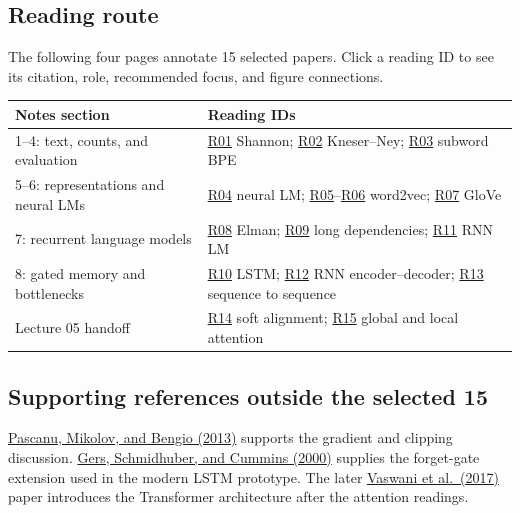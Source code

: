 \documentclass[11pt,a4paper]{article}
\newcommand{\readingref}[1]{\hyperlink{reading:#1}{#1}}
\begin{document}
\subsection{Reading route}
The following four pages annotate 15 selected papers. Click a reading ID
to see its citation, role, recommended focus, and figure connections.

\begin{tabularx}{\textwidth}{@{}l Y@{}}
\toprule
Notes section & Reading IDs\\
--4: text, counts, and evaluation & \readingref{R01} Shannon;
\readingref{R02} Kneser--Ney; \readingref{R03} subword BPE\\
5--6: representations and neural LMs & \readingref{R04} neural LM;
\readingref{R05}--\readingref{R06} word2vec; \readingref{R07} GloVe\\
7: recurrent language models & \readingref{R08} Elman;
\readingref{R09} long dependencies; \readingref{R11} RNN LM\\
8: gated memory and bottlenecks & \readingref{R10} LSTM;
\readingref{R12} RNN encoder--decoder; \readingref{R13} sequence to sequence\\
Lecture 05 handoff & \readingref{R14} soft alignment;
\readingref{R15} global and local attention\\
\bottomrule
\end{tabularx}

\subsection{Supporting references outside the selected 15}
\href{https://proceedings.mlr.press/v28/pascanu13.html}{Pascanu, Mikolov,
and Bengio (2013)} supports the gradient and clipping discussion.
\href{https://sferics.idsia.ch/pub/juergen/FgGates-NC.pdf}{Gers, Schmidhuber,
and Cummins (2000)} supplies the forget-gate extension used in the modern
LSTM prototype. The later
\href{https://arxiv.org/abs/1706.03762}{Vaswani et al.\ (2017)} paper
introduces the Transformer architecture after the attention readings.


\end{document}
